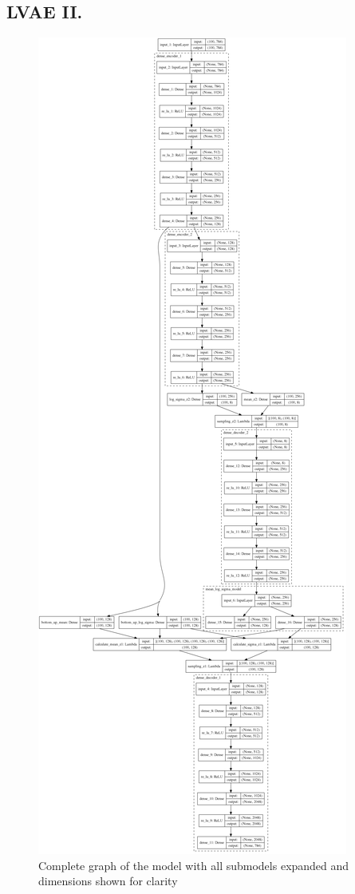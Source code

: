 \documentclass[12pt, english]{article}
\begin{document}
\subsection*{LVAE II.}
\label{sec:lvae2}

\begin{figure}[H]
    \centering
    \includegraphics[width=0.4\linewidth]{DenseLadderVAE_vertical.png} 
    \caption{Complete graph of the model with all submodels expanded and dimensions shown for clarity} 
    \label{fig:denseladdervae}
\end{figure}
\end{document}
